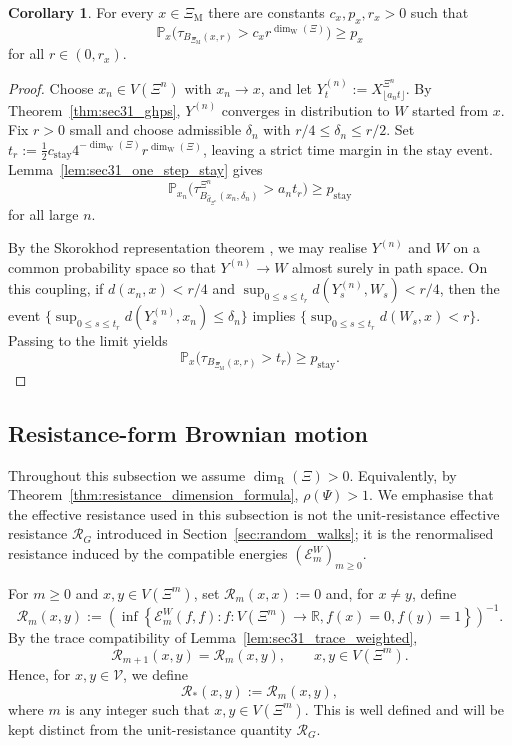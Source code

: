 \documentclass{article}
\DeclareRobustCommand{\revision}[1]{{\color{red}#1}}
\theoremstyle{plain}
\theoremstyle{definition}
\newtheorem{corollary}[theorem]{Corollary}
\newcommand{\Reff}{\mathscr{R}}
\newcommand{\dimwalk}{\dim_\mathrm{W}}
\newcommand{\dimresis}{\dim_\mathrm{R}}
\begin{document}
\begin{corollary}\label{cor:sec31_continuous_stay}
For every $x\in \Xi_{\mathrm M}$ there are constants $c_x,p_x,r_x>0$ such that
\[
\mathbb P_x\bigl(\tau_{B_{\Xi_{\mathrm M}}(x,r)}>c_xr^{\dimwalk(\Xi)}\bigr)\ge p_x
\]
for all $r\in(0,r_x)$.
\end{corollary}

\begin{proof}
Choose $x_n\in V(\Xi^n)$ with $x_n\to x$, and let $Y_t^{(n)}:=X_{\lfloor a_nt\rfloor}^{\Xi^n}$.
By Theorem~\ref{thm:sec31_ghps}, $Y^{(n)}$ converges in distribution to $W$ started from $x$.
Fix $r>0$ small and choose admissible $\delta_n$ with $r/4\le \delta_n\le r/2$.
\revision{Set $t_r:=\tfrac12c_{\mathrm{stay}}4^{-\dimwalk(\Xi)}r^{\dimwalk(\Xi)}$, leaving a strict time margin in the stay event.}
Lemma~\ref{lem:sec31_one_step_stay} gives
\[
\mathbb P_{x_n}\bigl(\tau_{B_{\hat d_{\Xi^n}}(x_n,\delta_n)}^{\Xi^n}>a_nt_r\bigr)\ge p_{\mathrm{stay}}
\]
for all large $n$.

By the Skorokhod representation theorem \cite{billingsley1999convergence}, we may realise $Y^{(n)}$ and $W$ on a common probability space so that $Y^{(n)}\to W$ almost surely in path space.
On this coupling, if $d(x_n,x)<r/4$ and $\sup_{0\le s\le t_r}d(Y_s^{(n)},W_s)<r/4$, then the event $\{\sup_{0\le s\le t_r}d(Y_s^{(n)},x_n)\le \delta_n\}$ implies $\{\sup_{0\le s\le t_r}d(W_s,x)<r\}$.
Passing to the limit yields
\[
\mathbb P_x\bigl(\tau_{B_{\Xi_{\mathrm M}}(x,r)}>t_r\bigr)\ge p_{\mathrm{stay}}.
\]
\end{proof}


\subsection{Resistance-form Brownian motion}\label{subsec:resistance_form}

Throughout this subsection we assume $\dimresis(\Xi)>0$.
Equivalently, by Theorem~\ref{thm:resistance_dimension_formula}, $\rho(\Psi)>1$.
We emphasise that the effective resistance used in this subsection is not the unit-resistance effective resistance $\Reff_G$ introduced in Section~\ref{sec:random_walks}; it is the renormalised resistance induced by the compatible energies $(\mathcal E_m^W)_{m\ge 0}$.

For $m\ge 0$ and $x,y\in V(\Xi^m)$, set $\Reff_m(x,x):=0$ and, for $x\ne y$, define
\[
\Reff_m(x,y)
:=
\left(
\inf\left\{
\mathcal E_m^W(f,f):
 f:V(\Xi^m)\to\mathbb R,
 f(x)=0,
 f(y)=1
\right\}
\right)^{-1}.
\]
By the trace compatibility of Lemma~\ref{lem:sec31_trace_weighted},
\[
\Reff_{m+1}(x,y)=\Reff_m(x,y),
\qquad x,y\in V(\Xi^m).
\]
Hence, for $x,y\in\mathscr V$, we define
\[
\Reff_*(x,y):=\Reff_m(x,y),
\]
where $m$ is any integer such that $x,y\in V(\Xi^m)$.
This is well defined and will be kept distinct from the unit-resistance quantity $\Reff_G$.
\end{document}
